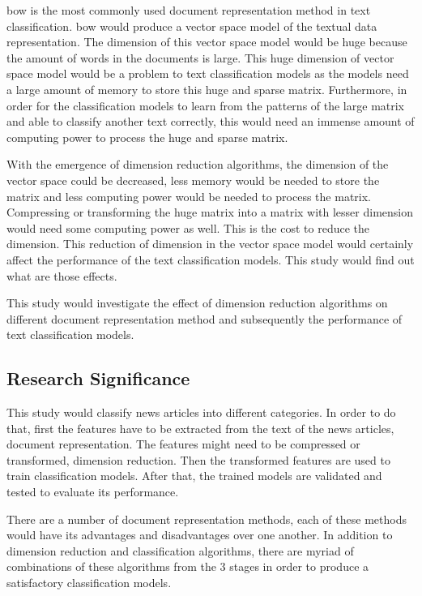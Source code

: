 \ac{bow} is the most commonly used document representation method in text classification. \Ac{bow} would produce a vector space model of the textual data representation. The dimension of this vector space model would be huge because the amount of words in the documents is large. This huge dimension of vector space model would be a problem to text classification models as the models need a large amount of memory to store this huge and sparse matrix. Furthermore, in order for the classification models to learn from the patterns of the large matrix and able to classify another text correctly, this would need an immense amount of computing power to process the huge and sparse matrix.

With the emergence of dimension reduction algorithms, the dimension of the vector space could be decreased, less memory would be needed to store the matrix and less computing power would be needed to process the matrix. Compressing or transforming the huge matrix into a matrix with lesser dimension would need some computing power as well. This is the cost to reduce the dimension. This reduction of dimension in the vector space model would certainly affect the performance of the text classification models. This study would find out what are those effects.

This study would investigate the effect of dimension reduction algorithms on different document representation method and subsequently the performance of text classification models.\\

\subsection{Research Significance}
This study would classify news articles into different categories. In order to do that, first the features have to be extracted from the text of the news articles, document representation. The features might need to be compressed or transformed, dimension reduction. Then the transformed features are used to train classification models. After that, the trained models are validated and tested to evaluate its performance.

There are a number of document representation methods, each of these methods would have its advantages and disadvantages over one another. In addition to dimension reduction and classification algorithms, there are myriad of combinations of these algorithms from the 3 stages in order to produce a satisfactory classification models. 

